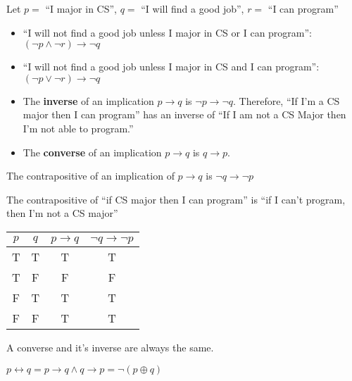 Let $p=$ ``I major in CS'', $q=$ ``I will find a good job'', $r=$ ``I can program''

\begin{itemize}

	\item ``I will not find a good job unless I major in CS or I can program'': $(\neg p \land \neg r)\rightarrow \neg q$

	\item ``I will not find a good job unless I major in CS and I can program'': $(\neg p \lor \neg r)\rightarrow \neg q$

	\item The \textbf{inverse} of an implication $p\rightarrow q$ is $\neg p\rightarrow \neg q$.
	      Therefore, ``If I'm a CS major then I can program'' has an inverse of
	      ``If I am not a CS Major then I'm not able to program.''

	\item The \textbf{converse} of an implication $p\rightarrow q$ is $q\rightarrow p$.

\end{itemize}

\begin{definition}[Contrapositive]
	The contrapositive of an implication of $p\rightarrow q$ is $\neg q\rightarrow \neg p$

	The contrapositive of ``if CS major then I can program'' is ``if I can't program, then I'm not a CS major''

	\begin{tabular}{|c|c|c|c|}
		\hline
		$p$ & $q$ & $p\rightarrow q$ & $\neg q\rightarrow \neg p$ \\
		\hline
		T   & T   & T                & T                          \\
		T   & F   & F                & F                          \\
		F   & T   & T                & T                          \\
		F   & F   & T                & T                          \\
		\hline
	\end{tabular}

	A converse and it's inverse are always the same.

\end{definition}

\begin{definition}[Biconditionals]
	$p\leftrightarrow q = p\rightarrow q \land q\rightarrow p = \neg (p\oplus q)$
\end{definition}

